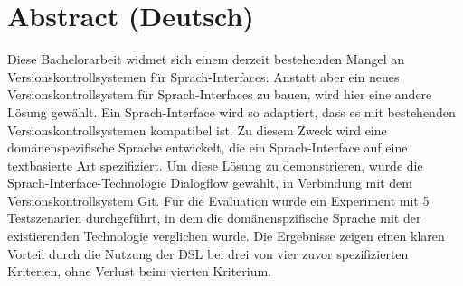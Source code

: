 \chapter*{Abstract (Deutsch)}

Diese Bachelorarbeit widmet sich einem derzeit bestehenden Mangel an Versionskontrollsystemen für Sprach-Interfaces.
Anstatt aber ein neues Versionskontrollsystem für Sprach-Interfaces zu bauen, wird hier eine andere Lösung gewählt. 
Ein Sprach-Interface wird so adaptiert, dass es mit bestehenden Versionskontrollsystemen kompatibel ist.
Zu diesem Zweck wird eine domänenspezifische Sprache entwickelt, die ein Sprach-Interface auf eine textbasierte Art spezifiziert. 
Um diese Lösung zu demonstrieren, wurde die Sprach-Interface-Technologie Dialogflow gewählt, in Verbindung mit dem Versionskontrollsystem Git.
Für die Evaluation wurde ein Experiment mit 5 Testszenarien durchgeführt, in dem die domänenspzifische Sprache mit der existierenden Technologie verglichen wurde. Die Ergebnisse zeigen einen klaren Vorteil durch die Nutzung der DSL bei drei von vier zuvor spezifizierten Kriterien, ohne Verlust beim vierten Kriterium.